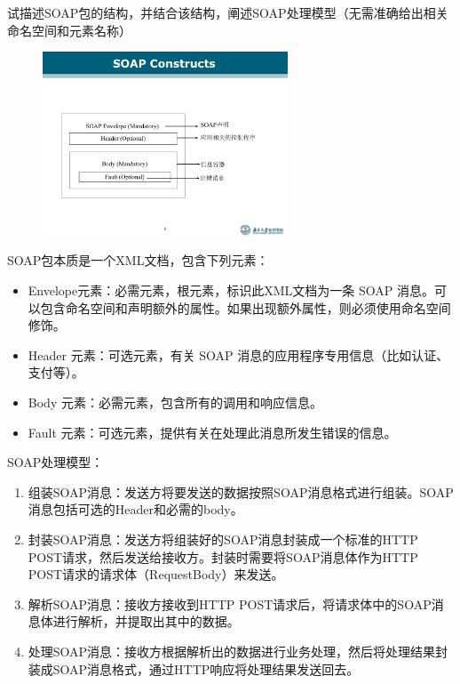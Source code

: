 \begin{problem}
试描述SOAP包的结构，并结合该结构，阐述SOAP处理模型（无需准确给出相关命名空间和元素名称）
\end{problem}

\begin{solution}
\begin{figure}[H]
    \vspace{-0.5em}
	\centering
	\includegraphics[width=0.65\textwidth]{SOAP结构.pdf}
    \vspace{-1em}
\end{figure}

SOAP包本质是一个XML文档，包含下列元素：
\begin{itemize}
    \item Envelope元素：必需元素，根元素，标识此XML文档为一条 SOAP 消息。可以包含命名空间和声明额外的属性。如果出现额外属性，则必须使用命名空间修饰。
    \item Header 元素：可选元素，有关 SOAP 消息的应用程序专用信息（比如认证、支付等）。
    \item Body 元素：必需元素，包含所有的调用和响应信息。
    \item Fault 元素：可选元素，提供有关在处理此消息所发生错误的信息。
\end{itemize}

SOAP处理模型：
\begin{enumerate}[label=\arabic*.]
    \item 组装SOAP消息：发送方将要发送的数据按照SOAP消息格式进行组装。SOAP消息包括可选的Header和必需的body。
    \item 封装SOAP消息：发送方将组装好的SOAP消息封装成一个标准的HTTP POST请求，然后发送给接收方。封装时需要将SOAP消息体作为HTTP POST请求的请求体（RequestBody）来发送。
    \item 解析SOAP消息：接收方接收到HTTP POST请求后，将请求体中的SOAP消息体进行解析，并提取出其中的数据。
    \item 处理SOAP消息：接收方根据解析出的数据进行业务处理，然后将处理结果封装成SOAP消息格式，通过HTTP响应将处理结果发送回去。
\end{enumerate}


\end{solution}

